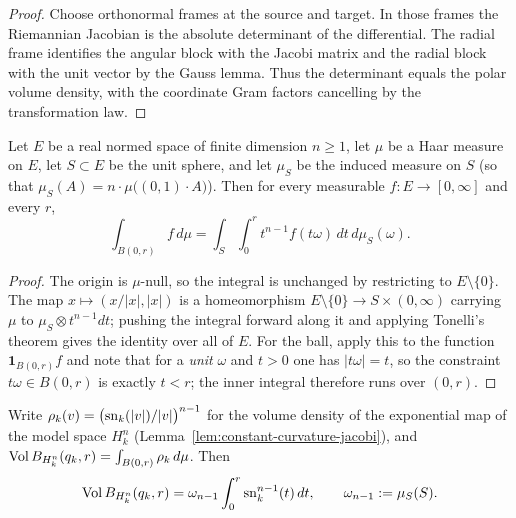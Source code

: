 \begin{proof}
\sketch
{}
Choose orthonormal frames at the source and target. In those frames the Riemannian Jacobian is the absolute determinant of the differential. The radial frame identifies the angular block with the Jacobi matrix and the radial block with the unit vector by the Gauss lemma. Thus the determinant equals the polar volume density, with the coordinate Gram factors cancelling by the transformation law.
\end{proof}


\begin{lemma}
\label{lem:polar-coordinates}




Let $E$ be a real normed space of finite dimension $n\ge1$, let $\mu$ be a Haar
measure on $E$, let $S\subset E$ be the unit sphere, and let $\mu_S$ be the
induced measure on $S$ (so that $\mu_S(A)=n\cdot\mu\bigl((0,1)\cdot A\bigr)$).
Then for every measurable $f\colon E\to[0,\infty]$ and every $r$,
$$\int_{B(0,r)}f\,d\mu
=\int_{S}\int_0^r t^{n-1}f(t\omega)\,dt\,d\mu_S(\omega).$$
\end{lemma}

\begin{proof}
\sketch

The origin is $\mu$-null, so the integral is unchanged by restricting to
$E\setminus\{0\}$. The map $x\mapsto(x/|x|,|x|)$ is a homeomorphism
$E\setminus\{0\}\to S\times(0,\infty)$ carrying $\mu$ to
$\mu_S\otimes t^{n-1}dt$; pushing the integral forward along it and applying
Tonelli's theorem gives the identity over all of $E$. For the ball, apply this
to the function $\mathbf 1_{B(0,r)}f$ and note that for a \emph{unit} $\omega$ and
$t>0$ one has $|t\omega|=t$, so the constraint $t\omega\in B(0,r)$ is exactly
$t<r$; the inner integral therefore runs over $(0,r)$.
\end{proof}

\begin{lemma}
\label{lem:model-ball-volume}




Write $\rho_k(v)=\bigl(\operatorname{sn}_k(|v|)/|v|\bigr)^{n-1}$ for the volume density of the
exponential map of the model space $H^n_k$ (Lemma~\ref{lem:constant-curvature-jacobi}),
and $\operatorname{Vol} B_{H^n_k}(q_k,r)=\int_{B(0,r)}\rho_k\,d\mu$. Then
$$\operatorname{Vol} B_{H^n_k}(q_k,r)=\omega_{n-1}\int_0^r\operatorname{sn}_k^{n-1}(t)\,dt,
\qquad \omega_{n-1}:=\mu_S(S).$$
\end{lemma}

